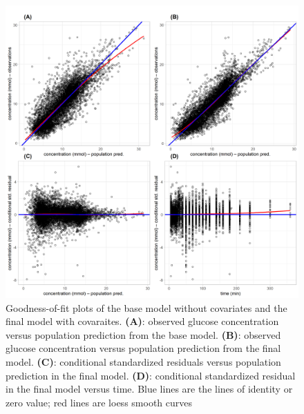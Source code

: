 \documentclass[utf8]{frontiersSCNS} %
\begin{document}
\begin{figure}[h!]
\begin{center}
\includegraphics[width=15cm]{comb.PNG}
\end{center}
\caption{Goodness-of-fit plots of the base model without covariates and the final model with covaraites. \textbf{(A)}: observed glucose concentration versus population prediction from the base model. \textbf{(B)}: observed glucose concentration versus population prediction from the final model. \textbf{(C)}: conditional standardized residuals versus population prediction in  the final model. \textbf{(D)}: conditional standardized residual in the final model versus time. Blue lines are the lines of identity or zero value; red lines are loess smooth curves}
\label{fig: fittings}
\end{figure}
\end{document}
